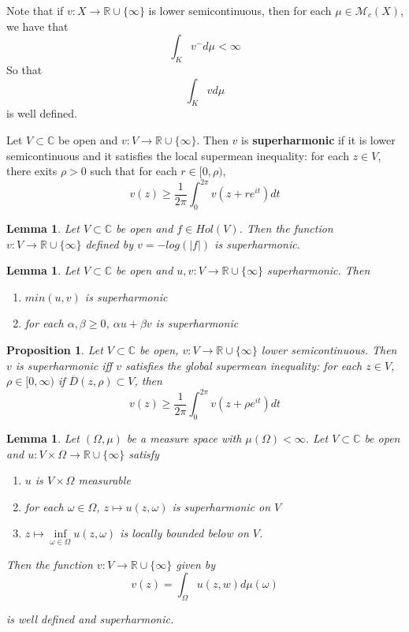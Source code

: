 \documentclass{amsart}
\newtheorem{lem}[thm]{Lemma}
\newtheorem{prop}[thm]{Proposition}
\newcommand{\C}{\mathbb{C}}
\newcommand{\MCM}{\mathcal{M}}
\newcommand{\RR}{\mathbb{R} \cup \{\infty\}}
\begin{document}
Note that if $v:X \rightarrow \RR$ is lower semicontinuous, then for each $\mu \in \MCM_c(X)$, we have that $$\int_{K}v^-d \mu < \infty$$ So that $$\int_{K}vd\mu$$ is well defined.

Let $V \subset \C$ be open and $v:V \rightarrow \RR$. Then $v$ is \textbf{superharmonic} if it is lower semicontinuous and it satisfies the local supermean inequality: for each $z \in V $, there exits $\rho > 0$
such that for each $r \in [0,\rho)$, $$v(z) \geq\frac{1}{2\pi}\int_0^{2\pi}v(z + re^{it})dt$$

\begin{lem}

Let $V \subset \C$ be open and $f \in Hol(V)$. Then the function $v:V \rightarrow \RR$ defined by $v = -log(|f|)$ is superharmonic.

\end{lem}

\begin{lem}

Let $V \subset \C$ be open and $u,v : V \rightarrow \RR$ superharmonic. Then 

\begin{enumerate}
\item $min(u,v)$ is superharmonic
\item for each $\alpha, \beta \geq 0$, $\alpha u + \beta v $ is superharmonic
\end{enumerate}

\end{lem}

\begin{prop}

Let $V \subset \C$ be open, $v:V \rightarrow \RR$ lower semicontinuous. Then $v$ is superharmonic iff $v$ satisfies the global supermean inequality: for each $z \in V$, $\rho \in [0,\infty)$ if $\overline{D}(z,\rho) \subset V$, then $$v(z) \geq \frac{1}{2\pi}\int_0^{2\pi}v(z + \rho e^{it})dt$$

\end{prop}

\begin{lem}

Let $(\Omega, \mu)$ be a measure space with $\mu(\Omega) < \infty$. Let $V \subset \C$ be open and $u: V \times \Omega \rightarrow \RR$ satisfy 

\begin{enumerate}
\item $u$ is $V\times\Omega$ measurable
\item for each $\omega \in \Omega$, $z \mapsto u(z,\omega)$ is superharmonic on $V$
\item $z \mapsto \inf\limits_{\omega \in \Omega}u(z,\omega)$ is locally bounded below on $V$.   
\end{enumerate}

Then the function $v:V \rightarrow \RR$ given by $$v(z)= \int_{\Omega}u(z,w)d\mu(\omega)$$ 

is well defined and superharmonic.  

\end{lem}
\end{document}

